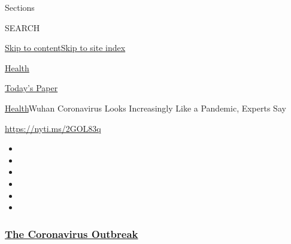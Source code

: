 Sections

SEARCH

\protect\hyperlink{site-content}{Skip to
content}\protect\hyperlink{site-index}{Skip to site index}

\href{https://www.nytimes3xbfgragh.onion/section/health}{Health}

\href{https://myaccount.nytimes3xbfgragh.onion/auth/login?response_type=cookie\&client_id=vi}{}

\href{https://www.nytimes3xbfgragh.onion/section/todayspaper}{Today's
Paper}

\href{/section/health}{Health}\textbar{}Wuhan Coronavirus Looks
Increasingly Like a Pandemic, Experts Say

\url{https://nyti.ms/2GOL83q}

\begin{itemize}
\item
\item
\item
\item
\item
\item
\end{itemize}

\hypertarget{the-coronavirus-outbreak}{%
\subsubsection{\texorpdfstring{\href{https://www.nytimes3xbfgragh.onion/news-event/coronavirus?name=styln-coronavirus-national\&region=TOP_BANNER\&block=storyline_menu_recirc\&action=click\&pgtype=Article\&impression_id=4eeb4450-f29d-11ea-b48a-7b43fab1412c\&variant=undefined}{The
Coronavirus
Outbreak}}{The Coronavirus Outbreak}}\label{the-coronavirus-outbreak}}

